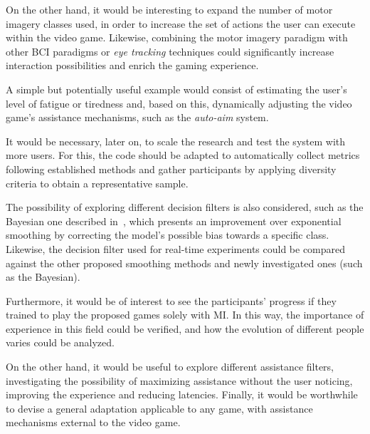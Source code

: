 On the other hand, it would be interesting to expand the number of motor imagery classes used, in order to increase the set of actions the user can execute within the video game. Likewise, combining the motor imagery paradigm with other BCI paradigms or \textit{eye tracking} techniques could significantly increase interaction possibilities and enrich the gaming experience.

A simple but potentially useful example would consist of estimating the user's level of fatigue or tiredness and, based on this, dynamically adjusting the video game's assistance mechanisms, such as the \textit{auto-aim} system.

It would be necessary, later on, to scale the research and test the system with more users. For this, the code should be adapted to automatically collect metrics following established methods and gather participants by applying diversity criteria to obtain a representative sample.

The possibility of exploring different decision filters is also considered, such as the Bayesian one described in~\cite{perdikis2011evidence}, which presents an improvement over exponential smoothing by correcting the model's possible bias towards a specific class. Likewise, the decision filter used for real-time experiments could be compared against the other proposed smoothing methods and newly investigated ones (such as the Bayesian).

Furthermore, it would be of interest to see the participants' progress if they trained to play the proposed games solely with MI. In this way, the importance of experience in this field could be verified, and how the evolution of different people varies could be analyzed.

On the other hand, it would be useful to explore different assistance filters, investigating the possibility of maximizing assistance without the user noticing, improving the experience and reducing latencies. Finally, it would be worthwhile to devise a general adaptation applicable to any game, with assistance mechanisms external to the video game.